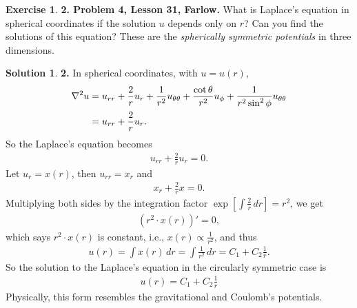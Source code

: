 \documentclass{article}
\theoremstyle{definition}
\newtheorem*{exer*}{Exercise}
\newtheorem*{sln*}{Solution}
\newcommand{\f}[2]{\frac{#1}{#2}}
\newcommand{\lb}{\left[}
\newcommand{\rb}{\right]}
\begin{document}
\begin{exer*}\textbf{2. Problem 4, Lesson 31, Farlow.} What is Laplace's equation in spherical coordinates if the solution $u$ depends only on $r$? Can you find the solutions of this equation? These are the \textit{spherically symmetric potentials} in three dimensions.
	
	\begin{sln*}\textbf{2.} In spherical coordinates, with $u = u(r)$,
		\begin{align*}
		\laplacian u &= u_{rr} + \f{2}{r}u_r + \f{1}{r^2}u_{\theta\theta} + \f{\cot\theta}{r^2}u_\phi + \f{1}{r^2\sin^2\phi}u_{\theta\theta}\\
		&= u_{rr} + \f{2}{r}u_r.
		\end{align*}
		So the Laplace's equation becomes
		\begin{align*}
		u_{rr} + \f{2}{r}u_r = 0.
		\end{align*}
		Let $u_r = x(r)$, then $u_{rr} = x_r$ and
		\begin{align*}
		x_r + \f{2}{r}x = 0.
		\end{align*}
		Multiplying both sides by the integration factor $\exp\lb \int \f{2}{r}\,dr \rb = r^2$, we get
		\begin{align*}
		(r^2 \cdot x(r))' = 0,
		\end{align*}
		which says $r^2 \cdot x(r)$ is constant, i.e., $x(r) \propto \f{1}{r^2}$, and thus
		\begin{align*}
		u(r) = \int x(r)\,dr = \int \f{1}{r^2}\,dr = C_1 + C_2 \f{1}{r}.
		\end{align*}
		So the solution to the Laplace's equation in the circularly symmetric case is
		\begin{align*}
		\boxed{u(r) = C_1 + C_2 \f{1}{r}}
		\end{align*}
		Physically, this form resembles the gravitational and Coulomb's potentials.
		
	\end{sln*}
\end{exer*}




\newpage
\end{document}
